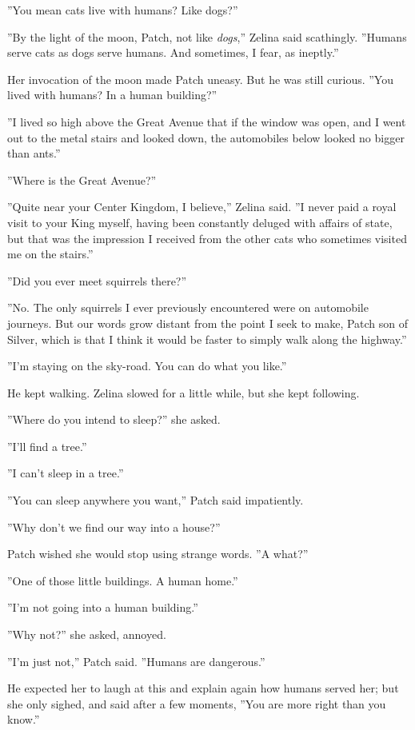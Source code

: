 \documentclass[11pt]{article}
\begin{document}
 ''You mean cats live with humans? Like dogs?''\par
 ''By the light of the moon, Patch, not like {\it dogs},'' Zelina said scathingly. ''Humans serve cats as dogs serve humans. And sometimes, I fear, as ineptly.''\par
 Her invocation of the moon made Patch uneasy. But he was still curious. ''You lived with humans? In a human building?''\par
 ''I lived so high above the Great Avenue that if the window was open, and I went out to the metal stairs and looked down, the automobiles below looked no bigger than ants.''\par
 ''Where is the Great Avenue?''\par
 ''Quite near your Center Kingdom, I believe,'' Zelina said. ''I never paid a royal visit to your King myself, having been constantly deluged with affairs of state, but that was the impression I received from the other cats who sometimes visited me on the stairs.''\par
 ''Did you ever meet squirrels there?''\par
 ''No. The only squirrels I ever previously encountered were on automobile journeys. But our words grow distant from the point I seek to make, Patch son of Silver, which is that I think it would be faster to simply walk along the highway.''\par
 ''I'm staying on the sky-road. You can do what you like.''\par
 He kept walking. Zelina slowed for a little while, but she kept following.\par
 ''Where do you intend to sleep?'' she asked.\par
 ''I'll find a tree.''\par
 ''I can't sleep in a tree.''\par
 ''You can sleep anywhere you want,'' Patch said impatiently.\par
 ''Why don't we find our way into a house?''\par
 Patch wished she would stop using strange words. ''A what?''\par
 ''One of those little buildings. A human home.''\par
 ''I'm not going into a human building.''\par
 ''Why not?'' she asked, annoyed.\par
 ''I'm just not,'' Patch said. ''Humans are dangerous.''\par
 He expected her to laugh at this and explain again how humans served her; but she only sighed, and said after a few moments, ''You are more right than you know.''\par
\end{document}
